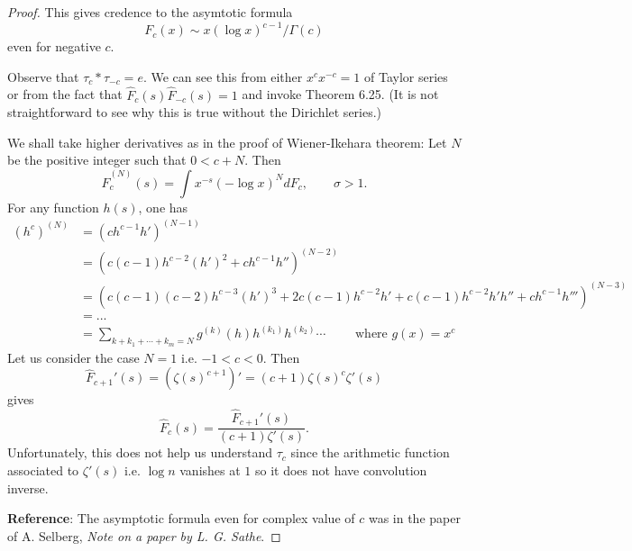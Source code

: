 \documentclass[12pt]{article}
\newcommand{\Fhat}{\widehat{F}}
\begin{document}
\begin{proof}

This gives credence to the asymtotic formula
$$F_c(x) \sim x (\log x)^{c-1} / \Gamma(c)$$
even for negative $c$.

Observe that $\tau_c * \tau_{-c} = e$. We can see this from either $x^c x^{-c} = 1$ of Taylor series or from the fact that $\Fhat_c(s) \Fhat_{-c}(s) = 1$ and invoke Theorem 6.25. (It is not straightforward to see why this is true without the Dirichlet series.)

We shall take higher derivatives as in the proof of Wiener-Ikehara theorem: Let $N$ be the positive integer such that $0 < c + N$. Then
$$\Fhat_c^{(N)}(s) = \int x^{-s} (-\log x)^N dF_c, \qquad \sigma > 1.$$
For any function $h(s)$, one has
\begin{align*}
(h^c)^{(N)} &= (c h^{c-1} h')^{(N-1)} \\
&= (c(c-1) h^{c-2} (h')^2 + ch^{c-1} h'')^{(N-2)} \\
&= (c(c-1)(c-2) h^{c-3} (h')^3 + 2 c(c-1) h^{c-2} h' + c(c-1) h^{c-2} h' h'' + ch^{c-1} h''')^{(N-3)} \\
&= ... \\
&= \sum_{k + k_1 + \cdots + k_m = N} g^{(k)}(h) h^{(k_1)} h^{(k_2)} \cdots \qquad \text{ where } g(x) = x^c
\end{align*}
Let us consider the case $N = 1$ i.e. $-1 < c < 0$. Then
$$\Fhat_{c+1}'(s) = (\zeta(s)^{c+1})' = (c + 1) \zeta(s)^c \zeta'(s)$$
gives
$$\Fhat_c(s) = \frac{\Fhat_{c+1}'(s)}{(c + 1) \zeta'(s)}.$$
Unfortunately, this does not help us understand $\tau_c$ since the arithmetic function associated to $\zeta'(s)$ i.e. $\log n$ vanishes at $1$ so it does not have convolution inverse.

\textbf{Reference}: The asymptotic formula even for complex value of $c$ was in the paper of A. Selberg, \textit{Note on a paper by L. G. Sathe}.
\end{proof}

\unless\ifdefined\IsMainDocument
\end{document}
